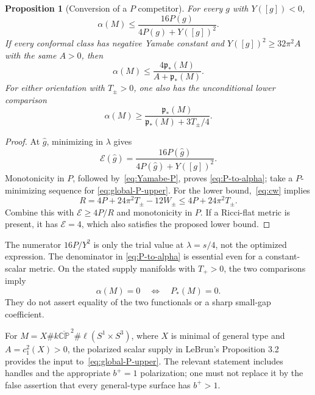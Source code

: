 \documentclass[11pt]{article}
\newcommand{\CP}{\mathbb{CP}}
\newcommand{\cE}{\mathcal E}
\newcommand{\pstar}{\mathfrak p_*}
\newtheorem{proposition}[theorem]{Proposition}
\theoremstyle{definition}
\theoremstyle{remark}
\begin{document}
\begin{proposition}[Conversion of a $P$ competitor]
\label{prop:conversion}
For every $g$ with $Y([g])<0$,
\begin{equation}
 \boxed{\alpha(M)\le
 \frac{16P(g)}{4P(g)+Y([g])^2}.}
 \label{eq:P-to-alpha}
\end{equation}
If every conformal class has negative Yamabe constant and
$Y([g])^2\ge32\pi^2A$ with the same $A>0$, then
\begin{equation}
 \boxed{\alpha(M)\le\frac{4\pstar(M)}{A+\pstar(M)}.}
 \label{eq:global-P-upper}
\end{equation}
For either orientation with $T_\pm>0$, one also has the unconditional
lower comparison
\begin{equation}
 \boxed{\alpha(M)\ge
 \frac{\pstar(M)}{\pstar(M)+3T_\pm/4}.}
 \label{eq:global-P-lower}
\end{equation}
\end{proposition}
\begin{proof}
At $\widehat g$, minimizing in $\lambda$ gives
\[
 \cE(\widehat g)=\frac{16P(\widehat g)}{4P(\widehat g)+Y([g])^2}.
\]
Monotonicity in $P$, followed by~\eqref{eq:Yamabe-P}, proves
\eqref{eq:P-to-alpha}; take a $P$-minimizing sequence for
\eqref{eq:global-P-upper}. For the lower bound,~\eqref{eq:cw} implies
\[
 R=4P+24\pi^2T_\pm-12W_\pm\le4P+24\pi^2T_\pm.
\]
Combine this with $\cE\ge4P/R$ and monotonicity in $P$.
If a Ricci-flat metric is present, it has $\cE=4$, which also satisfies
the proposed lower bound.
\end{proof}

The numerator $16P/Y^2$ is only the trial value at $\lambda=s/4$,
not the optimized expression. The denominator in
\eqref{eq:P-to-alpha} is essential even for a constant-scalar metric.
On the stated supply manifolds with $T_+>0$, the two comparisons imply
\begin{equation}
 \alpha(M)=0\quad\Longleftrightarrow\quad P_*(M)=0.
 \label{eq:conditional-zero-equivalence}
\end{equation}
They do not assert equality of the two functionals or a sharp small-gap
coefficient.

For
$M=X\#k\overline{\CP}^{\,2}\#\ell(S^1\times S^3)$,
where $X$ is minimal of general type and $A=c_1^2(X)>0$,
the polarized scalar supply in LeBrun's Proposition 3.2~\cite{LeBrun}
provides the input to~\eqref{eq:global-P-upper}. The relevant statement
includes handles and the appropriate $b^+=1$ polarization; one must not
replace it by the false assertion that every general-type surface has
$b^+>1$.
\end{document}
